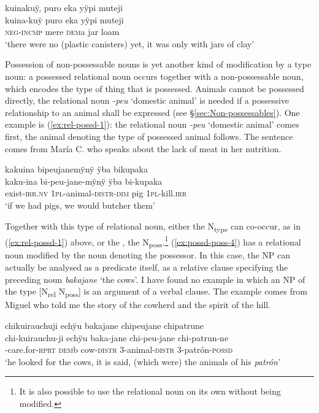 {\ea\label{ex:NP-2}
\begingl
\glpreamble kuinakuÿ, puro eka yÿpi muteji\\
\gla kuina-kuÿ puro eka yÿpi muteji\\
\glb \textsc{neg}-\textsc{incmp} mere \textsc{dem}a jar loam\\
\glft ‘there were no (plastic canisters) yet, it was only with jars of clay’
\endgl
\trailingcitation{[jxx-p120515l-2.058]}
\xe

Possession of non-possessable nouns is yet another kind of modification by a type noun: a possessed relational noun occurs together with a non-possessable noun, which encodes the type of thing that is possessed.  Animals cannot be possessed directly, the relational noun \textit{-peu} ‘domestic animal’ is needed if a possessive relationship to an animal shall be expressed (see §\ref{sec:Non-possessables}). One example is (\ref{ex:rel-possd-1}): the relational noun \textit{-peu} ‘domestic animal’ comes first, the animal denoting the type of possessed animal follows. The sentence comes from María C. who speaks about the lack of meat in her nutrition.

\ea\label{ex:rel-possd-1}
\begingl
\glpreamble kakuina bipeujanemÿnÿ ÿba bikupaka\\
\gla kaku-ina bi-peu-jane-mÿnÿ ÿba bi-kupaka\\ 
\glb exist-\textsc{irr.nv} 1\textsc{pl}-animal-\textsc{distr}-\textsc{dim} pig 1\textsc{pl}-kill.\textsc{irr}\\ 
\glft ‘if we had pigs, we would butcher them’
\trailingcitation{[uxx-p110825l.200]}
\xe


Together with this type of relational noun, either the N\textsubscript{type} can co-occur, as in (\ref{ex:rel-possd-1}) above, or the , the N\textsubscript{poss}.\footnote{It is also possible to use the relational noun on its own without being modified.}  (\ref{ex:possd-poss-4}) has a relational noun modified by the noun denoting the possessor. In this case, the NP can actually be analysed as a predicate itself, as a relative clause specifying the preceding noun \textit{bakajane} ‘the cows’. I have found no example in which an NP of the type [N\textsubscript{rel} N\textsubscript{poss}] is an argument of a verbal clause. The example comes from Miguel who told me the story of the cowherd and the spirit of the hill.

\ea\label{ex:possd-poss-4}
\begingl
\glpreamble chikuirauchuji echÿu bakajane chipeujane chipatrune\\
\gla chi-kuirauchu-ji echÿu baka-jane chi-peu-jane chi-patrun-ne\\
-care.for-\textsc{rprt} \textsc{dem}b cow-\textsc{distr} 3-animal-\textsc{distr} 3-patrón-\textsc{possd}\\
\glft ‘he looked for the cows, it is said, (which were) the animals of his \textit{patrón}’
\endgl
\trailingcitation{[mxx-n151017l-1.02]}
\xe

}
